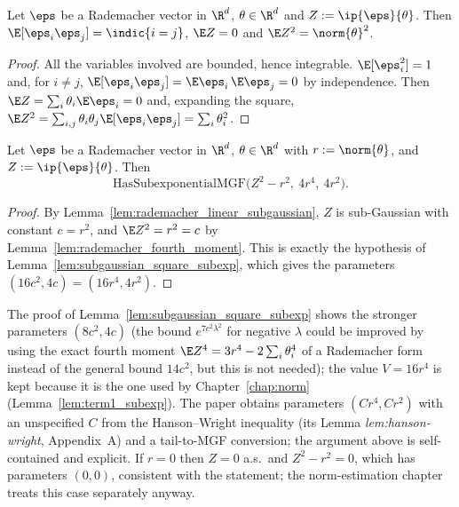 \begin{lemma}\label{lem:rademacher_fourth_moment}
\leanok
{}
Let $\eps$ be a Rademacher vector in $\R^d$, $\theta\in\R^d$ and $Z := \ip{\eps}{\theta}$. Then
$\E[\eps_i\eps_j] = \indic\{i = j\}$, $\E Z = 0$ and $\E Z^2 = \norm{\theta}^2$.
\end{lemma}

\begin{proof}
\leanok
{}
All the variables involved are bounded, hence integrable. $\E[\eps_i^2] = 1$ and, for
$i \ne j$, $\E[\eps_i\eps_j] = \E\eps_i\,\E\eps_j = 0$ by independence. Then
$\E Z = \sum_i\theta_i\E\eps_i = 0$ and, expanding the square,
$\E Z^2 = \sum_{i,j}\theta_i\theta_j\E[\eps_i\eps_j] = \sum_i\theta_i^2$.
\end{proof}

\begin{lemma}
\label{lem:rademacher_square_subexp}
\leanok
{}
Let $\eps$ be a Rademacher vector in $\R^d$, $\theta \in \R^d$ with $r := \norm{\theta}$, and
$Z := \ip{\eps}{\theta}$. Then
\[
  \mathrm{HasSubexponentialMGF}\big(Z^2 - r^2,\ 4r^4,\ 4r^2\big).
\]
\end{lemma}

\begin{proof}
\leanok
{}
By Lemma~\ref{lem:rademacher_linear_subgaussian}, $Z$ is sub-Gaussian with constant
$c = r^2$, and $\E Z^2 = r^2 = c$ by Lemma~\ref{lem:rademacher_fourth_moment}. This is exactly
the hypothesis of Lemma~\ref{lem:subgaussian_square_subexp}, which gives the parameters
$(16c^2, 4c) = (16r^4, 4r^2)$.
\end{proof}

\begin{remark}[Constants, and the case $r = 0$]\label{rem:ps_rademacher_constants}
The proof of Lemma~\ref{lem:subgaussian_square_subexp} shows the stronger parameters
$(8c^2, 4c)$ (the bound $e^{7c^2\lambda^2}$ for negative $\lambda$ could be improved by using
the exact fourth moment $\E Z^4 = 3r^4 - 2\sum_i\theta_i^4$ of a Rademacher form instead of
the general bound $14c^2$, but this is not needed); the value $V = 16r^4$ is kept because it is
the one used by Chapter~\ref{chap:norm} (Lemma~\ref{lem:term1_subexp}). The paper obtains
parameters $(Cr^4, Cr^2)$ with an unspecified $C$ from the Hanson--Wright inequality (its
Lemma \emph{lem:hanson-wright}, Appendix~A) and a tail-to-MGF conversion; the argument above
is self-contained and explicit. If $r = 0$ then $Z = 0$ a.s.\ and $Z^2 - r^2 = 0$, which has
parameters $(0, 0)$, consistent with the statement; the norm-estimation chapter treats this
case separately anyway.
\end{remark}

